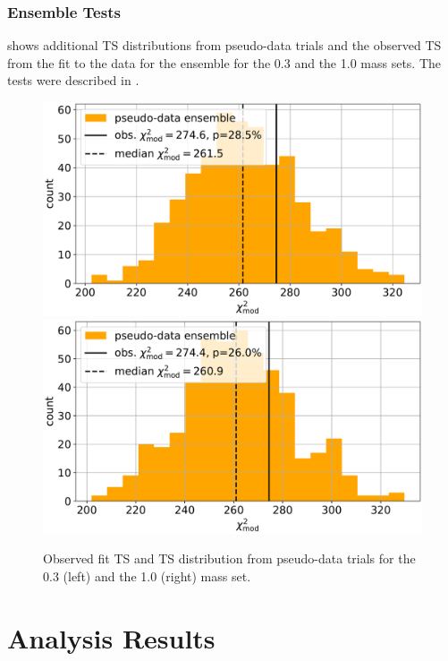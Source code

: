 

\subsection{Ensemble Tests} 

 shows additional TS distributions from pseudo-data trials and the observed TS from the fit to the data for the ensemble for the \SI{0.3}{\gev} and the \SI{1.0}{\gev} mass sets. The tests were described in .

\begin{figure}[h]
    \includegraphics[width=0.49\linewidth]{figures/results/blind_fits/full_blind_fit_0.6_GeV_gauss_plus_poisson_step_3_4-1.png}
    \includegraphics[width=0.49\linewidth]{figures/results/blind_fits/full_blind_fit_1.0_GeV_gauss_plus_poisson_step_3_4-1.png}
	\caption[Pseudo-data trials TS distribution (\SI{0.3}{\gev}, \SI{1.0}{\gev})]{Observed fit TS and TS distribution from pseudo-data trials for the \SI{0.3}{\gev} (left) and the \SI{1.0}{\gev} (right) mass set.}
\end{figure}


\chapter{Analysis Results}

